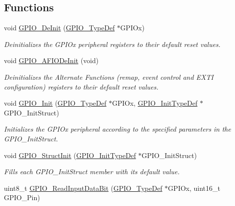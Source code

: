 \subsection*{Functions}
\begin{DoxyCompactItemize}
\item 
void \hyperlink{group___g_p_i_o___exported___functions_gaa60bdf3182c44b5fa818f237042f52ee}{G\+P\+I\+O\+\_\+\+De\+Init} (\hyperlink{struct_g_p_i_o___type_def}{G\+P\+I\+O\+\_\+\+Type\+Def} $\ast$G\+P\+I\+Ox)
\begin{DoxyCompactList}\small\item\em Deinitializes the G\+P\+I\+Ox peripheral registers to their default reset values. \end{DoxyCompactList}\item 
void \hyperlink{group___g_p_i_o___exported___functions_ga7f645e6b6146818c3d6c19021e70170c}{G\+P\+I\+O\+\_\+\+A\+F\+I\+O\+De\+Init} (void)
\begin{DoxyCompactList}\small\item\em Deinitializes the Alternate Functions (remap, event control and E\+X\+TI configuration) registers to their default reset values. \end{DoxyCompactList}\item 
void \hyperlink{group___g_p_i_o___exported___functions_ga71abf9404261370d03cca449b88d3a65}{G\+P\+I\+O\+\_\+\+Init} (\hyperlink{struct_g_p_i_o___type_def}{G\+P\+I\+O\+\_\+\+Type\+Def} $\ast$G\+P\+I\+Ox, \hyperlink{struct_g_p_i_o___init_type_def}{G\+P\+I\+O\+\_\+\+Init\+Type\+Def} $\ast$G\+P\+I\+O\+\_\+\+Init\+Struct)
\begin{DoxyCompactList}\small\item\em Initializes the G\+P\+I\+Ox peripheral according to the specified parameters in the G\+P\+I\+O\+\_\+\+Init\+Struct. \end{DoxyCompactList}\item 
void \hyperlink{group___g_p_i_o___exported___functions_gab28de41278e7f8c63d0851e2733b10df}{G\+P\+I\+O\+\_\+\+Struct\+Init} (\hyperlink{struct_g_p_i_o___init_type_def}{G\+P\+I\+O\+\_\+\+Init\+Type\+Def} $\ast$G\+P\+I\+O\+\_\+\+Init\+Struct)
\begin{DoxyCompactList}\small\item\em Fills each G\+P\+I\+O\+\_\+\+Init\+Struct member with its default value. \end{DoxyCompactList}\item 
uint8\+\_\+t \hyperlink{group___g_p_i_o___exported___functions_ga98772ef6b639b3fa06c8ae5ba28d3aaa}{G\+P\+I\+O\+\_\+\+Read\+Input\+Data\+Bit} (\hyperlink{struct_g_p_i_o___type_def}{G\+P\+I\+O\+\_\+\+Type\+Def} $\ast$G\+P\+I\+Ox, uint16\+\_\+t G\+P\+I\+O\+\_\+\+Pin)

\end{DoxyCompactItemize}
